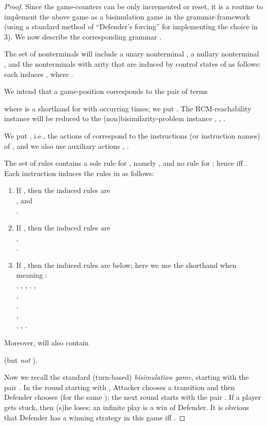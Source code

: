 \documentclass[a4paper,11pt]{article}
\begin{document}
\begin{proof}
Since the game-counters can be only incremented or reset, it is a
routine
to implement the above game as a bisimulation game in the
grammar-framework
(using a standard
method of ``Defender's forcing'' for implementing the choice in 3).
We now describe the corresponding 
grammar .

The set  of nonterminals will include 
a unary nonterminal , a nullary nonterminal , and the
nonterminals with arity   that are induced by control states of
 as follows:
each  induces 
, where .

We intend that 
a game-position  corresponds to the
pair of terms 

where  is a shorthand for 
 with  occurring  times; we put
.
The RCM-reachability instance  will be
reduced to the (non)bisimilarity-problem instance , 
, .


We put , i.e., the actions of
 correspond to the instructions (or instruction names)
of , and we also use
auxiliary actions , .

The set of rules  contains a sole rule for , namely
, and no rule for ;
hence  iff .
Each instruction    induces the rules in  as
follows:

\begin{enumerate}
		\item
If , then the induced rules are
\\
, and
\\
.
\item
If , then the induced rules are
\\
,
\\
.
\item
If , then the induced rules are below;
here we use the shorthand  when meaning 
:
\\
,
,
,
,
,
\\
,
\\
,
\\
,
\\
,
,
.
\end{enumerate}
Moreover,  will also contain
 
(but \emph{not} ). 

Now we recall the standard (turn-based) \emph{bisimulation game}, starting
with the pair
.
In the round starting with , Attacker chooses a transition
 and then Defender chooses  (for
the same ); the
next round starts with the pair . If a player gets
stuck, then (s)he loses; an infinite play is a win of Defender.
It is obvious that Defender has a winning strategy in this game iff 
.


\end{proof}
\end{document}
